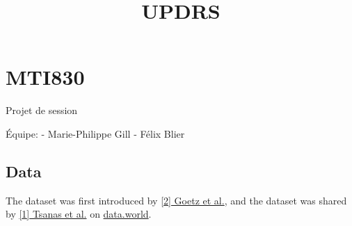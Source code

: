\documentclass[11pt]{article}
\title{UPDRS}
\begin{document}
    
    
    \maketitle
    
    

    
    \section{MTI830}\label{mti830}

    Projet de session

Équipe: - Marie-Philippe Gill - Félix Blier

    \subsection{Data}\label{data}

    The dataset was first introduced by
\href{https://onlinelibrary.wiley.com/doi/full/10.1002/mds.22379}{{[}2{]}
Goetz et al.}, and the dataset was shared by
\href{https://ieeexplore.ieee.org/abstract/document/5339170}{{[}1{]}
Tsanas et al.} on
\href{https://data.world/uci/parkinsons-telemonitoring/workspace/project-summary?agentid=uci\&datasetid=parkinsons-telemonitoring}{data.world}.
\end{document}
